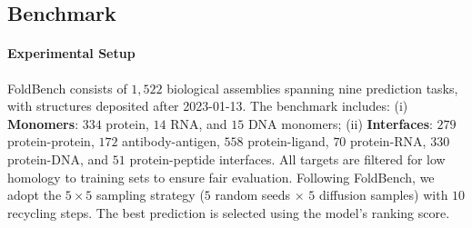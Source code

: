 \documentclass[]{bytedance_seed}
\begin{document}
\subsection{Benchmark}



\paragraph{Experimental Setup}
FoldBench consists of $1,522$ biological assemblies spanning nine prediction tasks, with structures deposited after 2023-01-13. The benchmark includes: (i) \textbf{Monomers}: $334$ protein, $14$ RNA, and $15$ DNA monomers; (ii) \textbf{Interfaces}: $279$ protein-protein, $172$ antibody-antigen, $558$ protein-ligand, $70$ protein-RNA, $330$ protein-DNA, and $51$ protein-peptide interfaces. All targets are filtered for low homology to training sets to ensure fair evaluation. Following FoldBench, we adopt the $5\times5$ sampling strategy ($5$ random seeds $\times$ $5$ diffusion samples) with $10$ recycling steps. The best prediction is selected using the model's ranking score.
\end{document}
